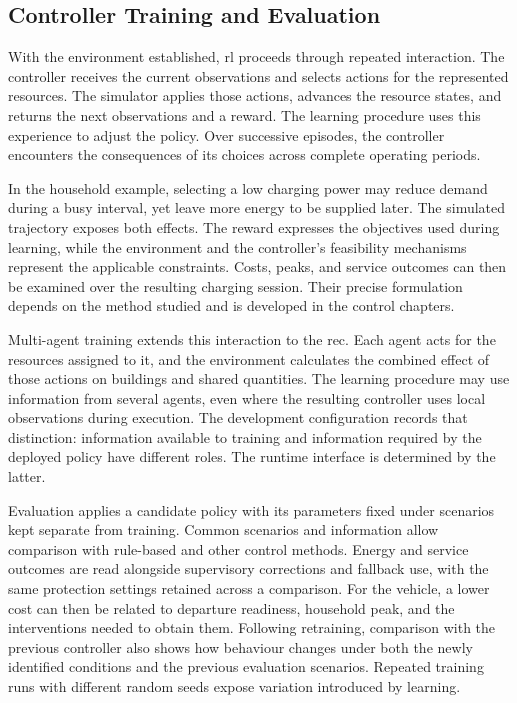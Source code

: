 \subsection{Controller Training and Evaluation}
\label{sec:energaize-training-evaluation}

With the environment established, \gls{rl} proceeds through repeated interaction. The controller receives the current observations and selects actions for the represented resources. The simulator applies those actions, advances the resource states, and returns the next observations and a reward. The learning procedure uses this experience to adjust the policy. Over successive episodes, the controller encounters the consequences of its choices across complete operating periods.

In the household example, selecting a low charging power may reduce demand during a busy interval, yet leave more energy to be supplied later. The simulated trajectory exposes both effects. The reward expresses the objectives used during learning, while the environment and the controller's feasibility mechanisms represent the applicable constraints. Costs, peaks, and service outcomes can then be examined over the resulting charging session. Their precise formulation depends on the method studied and is developed in the control chapters.

Multi-agent training extends this interaction to the \gls{rec}. Each agent acts for the resources assigned to it, and the environment calculates the combined effect of those actions on buildings and shared quantities. The learning procedure may use information from several agents, even where the resulting controller uses local observations during execution. The development configuration records that distinction: information available to training and information required by the deployed policy have different roles. The runtime interface is determined by the latter.

Evaluation applies a candidate policy with its parameters fixed under scenarios kept separate from training. Common scenarios and information allow comparison with rule-based and other control methods. Energy and service outcomes are read alongside supervisory corrections and fallback use, with the same protection settings retained across a comparison. For the vehicle, a lower cost can then be related to departure readiness, household peak, and the interventions needed to obtain them. Following retraining, comparison with the previous controller also shows how behaviour changes under both the newly identified conditions and the previous evaluation scenarios. Repeated training runs with different random seeds expose variation introduced by learning.

